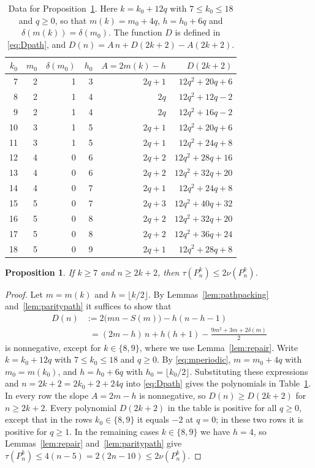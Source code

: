 \documentclass{amsart}
\newtheorem{proposition}[theorem]{Proposition}
\theoremstyle{definition}
\theoremstyle{remark}
\numberwithin{equation}{section}
\numberwithin{table}{section}
\begin{document}
\begin{table}[t]
\caption{Data for Proposition~\ref{prop:longpath}. Here $k=k_0+12q$ with $7\le k_0\le18$ and $q\ge0$, so that $m(k)=m_0+4q$, $h=h_0+6q$ and $\delta(m(k))=\delta(m_0)$. The function $D$ is defined in \eqref{eq:Dpath}, and $D(n)=A\,n+D(2k+2)-A(2k+2)$.}\label{tab:path}
\renewcommand{\arraystretch}{1.1}
\begin{tabular}{rrrrrr}
\toprule
$k_0$ & $m_0$ & $\delta(m_0)$ & $h_0$ & $A=2m(k)-h$ & $D(2k+2)$\\
\midrule
7 & 2 & 1 & 3 & $2q+1$ & $12q^2+20q+6$\\
8 & 2 & 1 & 4 & $2q$ & $12q^2+12q-2$\\
9 & 2 & 1 & 4 & $2q$ & $12q^2+16q-2$\\
10 & 3 & 1 & 5 & $2q+1$ & $12q^2+20q+6$\\
11 & 3 & 1 & 5 & $2q+1$ & $12q^2+24q+8$\\
12 & 4 & 0 & 6 & $2q+2$ & $12q^2+28q+16$\\
13 & 4 & 0 & 6 & $2q+2$ & $12q^2+32q+20$\\
14 & 4 & 0 & 7 & $2q+1$ & $12q^2+24q+8$\\
15 & 5 & 0 & 7 & $2q+3$ & $12q^2+40q+32$\\
16 & 5 & 0 & 8 & $2q+2$ & $12q^2+32q+20$\\
17 & 5 & 0 & 8 & $2q+2$ & $12q^2+36q+24$\\
18 & 5 & 0 & 9 & $2q+1$ & $12q^2+28q+8$\\
\bottomrule
\end{tabular}
\end{table}

\begin{proposition}\label{prop:longpath}
If $k\ge7$ and $n\ge2k+2$, then $\tau(P_n^k)\le2\nu(P_n^k)$.
\end{proposition}

\begin{proof}
Let $m=m(k)$ and $h=\lfloor k/2\rfloor$. By Lemmas~\ref{lem:pathpacking} and~\ref{lem:paritypath} it suffices to show that
\begin{equation}\label{eq:Dpath}
\begin{split}
D(n)&:=2\bigl(mn-S(m)\bigr)-h(n-h-1)\\
&\phantom{:}=(2m-h)\,n+h(h+1)-\frac{9m^2+3m+2\delta(m)}2
\end{split}
\end{equation}
is nonnegative, except for $k\in\{8,9\}$, where we use Lemma~\ref{lem:repair}. Write $k=k_0+12q$ with $7\le k_0\le18$ and $q\ge0$. By \eqref{eq:mperiodic}, $m=m_0+4q$ with $m_0=m(k_0)$, and $h=h_0+6q$ with $h_0=\lfloor k_0/2\rfloor$. Substituting these expressions and $n=2k+2=2k_0+2+24q$ into \eqref{eq:Dpath} gives the polynomials in Table~\ref{tab:path}. In every row the slope $A=2m-h$ is nonnegative, so $D(n)\ge D(2k+2)$ for $n\ge2k+2$. Every polynomial $D(2k+2)$ in the table is positive for all $q\ge0$, except that in the rows $k_0\in\{8,9\}$ it equals $-2$ at $q=0$; in these two rows it is positive for $q\ge1$. In the remaining cases $k\in\{8,9\}$ we have $h=4$, so Lemmas~\ref{lem:repair} and~\ref{lem:paritypath} give $\tau(P_n^k)\le4(n-5)=2(2n-10)\le2\nu(P_n^k)$.
\end{proof}
\end{document}

